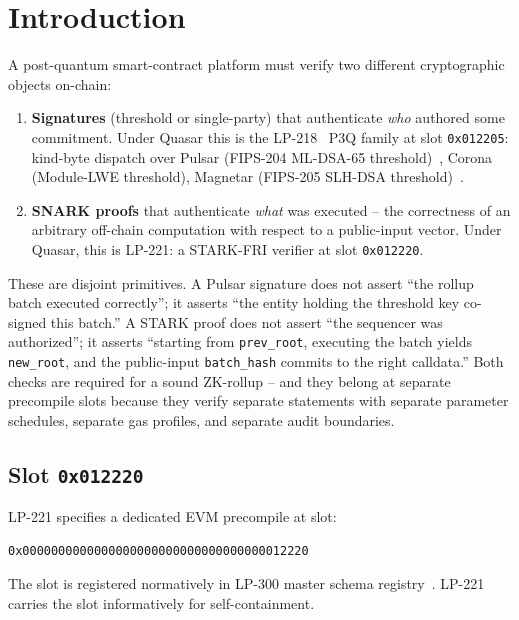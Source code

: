 \section{Introduction}
\label{sec:introduction}

A post-quantum smart-contract platform must verify two different
cryptographic objects on-chain:

\begin{enumerate}[leftmargin=2em,nosep]
\item \textbf{Signatures} (threshold or single-party) that
  authenticate \emph{who} authored some commitment. Under Quasar
  this is the LP-218~\cite{lp218} P3Q family at slot
  \texttt{0x012205}: kind-byte dispatch over Pulsar (FIPS-204
  ML-DSA-65 threshold)~\cite{fips204}, Corona (Module-LWE threshold),
  Magnetar (FIPS-205 SLH-DSA threshold)~\cite{fips205}.
\item \textbf{SNARK proofs} that authenticate \emph{what} was
  executed -- the correctness of an arbitrary off-chain computation
  with respect to a public-input vector. Under Quasar, this is
  LP-221: a STARK-FRI verifier at slot \texttt{0x012220}.
\end{enumerate}

These are disjoint primitives. A Pulsar signature does not assert
``the rollup batch executed correctly''; it asserts ``the entity
holding the threshold key co-signed this batch.'' A STARK proof
does not assert ``the sequencer was authorized''; it asserts
``starting from \texttt{prev\_root}, executing the batch yields
\texttt{new\_root}, and the public-input \texttt{batch\_hash}
commits to the right calldata.'' Both checks are required for a
sound ZK-rollup -- and they belong at separate precompile slots
because they verify separate statements with separate parameter
schedules, separate gas profiles, and separate audit boundaries.

\subsection{Slot \texttt{0x012220}}

LP-221 specifies a dedicated EVM precompile at slot:

\begin{lstlisting}[language={}]
0x0000000000000000000000000000000000012220
\end{lstlisting}

The slot is registered normatively in LP-300 master schema
registry~\cite{lp300}. LP-221 carries the slot informatively
for self-containment.

